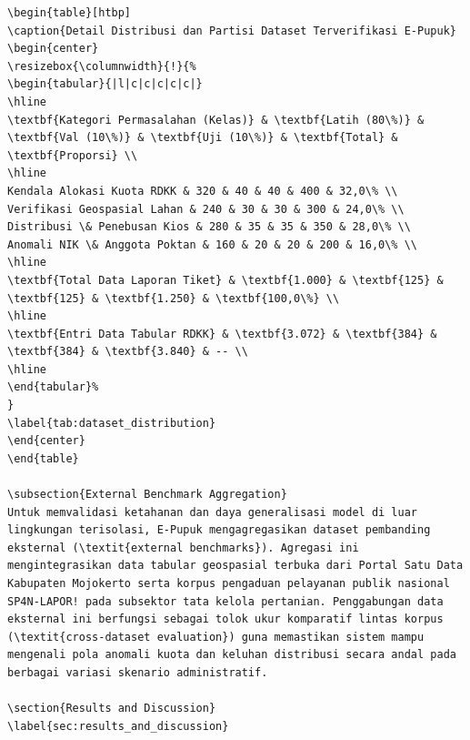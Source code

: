 \documentclass[conference]{IEEEtran}
\begin{document}
\begin{lstlisting}
\begin{table}[htbp]
\caption{Detail Distribusi dan Partisi Dataset Terverifikasi E-Pupuk}
\begin{center}
\resizebox{\columnwidth}{!}{%
\begin{tabular}{|l|c|c|c|c|c|}
\hline
\textbf{Kategori Permasalahan (Kelas)} & \textbf{Latih (80\%)} & \textbf{Val (10\%)} & \textbf{Uji (10\%)} & \textbf{Total} & \textbf{Proporsi} \\
\hline
Kendala Alokasi Kuota RDKK & 320 & 40 & 40 & 400 & 32,0\% \\
Verifikasi Geospasial Lahan & 240 & 30 & 30 & 300 & 24,0\% \\
Distribusi \& Penebusan Kios & 280 & 35 & 35 & 350 & 28,0\% \\
Anomali NIK \& Anggota Poktan & 160 & 20 & 20 & 200 & 16,0\% \\
\hline
\textbf{Total Data Laporan Tiket} & \textbf{1.000} & \textbf{125} & \textbf{125} & \textbf{1.250} & \textbf{100,0\%} \\
\hline
\textbf{Entri Data Tabular RDKK} & \textbf{3.072} & \textbf{384} & \textbf{384} & \textbf{3.840} & -- \\
\hline
\end{tabular}%
}
\label{tab:dataset_distribution}
\end{center}
\end{table}

\subsection{External Benchmark Aggregation}
Untuk memvalidasi ketahanan dan daya generalisasi model di luar lingkungan terisolasi, E-Pupuk mengagregasikan dataset pembanding eksternal (\textit{external benchmarks}). Agregasi ini mengintegrasikan data tabular geospasial terbuka dari Portal Satu Data Kabupaten Mojokerto serta korpus pengaduan pelayanan publik nasional SP4N-LAPOR! pada subsektor tata kelola pertanian. Penggabungan data eksternal ini berfungsi sebagai tolok ukur komparatif lintas korpus (\textit{cross-dataset evaluation}) guna memastikan sistem mampu mengenali pola anomali kuota dan keluhan distribusi secara andal pada berbagai variasi skenario administratif.

\section{Results and Discussion}
\label{sec:results_and_discussion}


\end{lstlisting}
\end{document}
